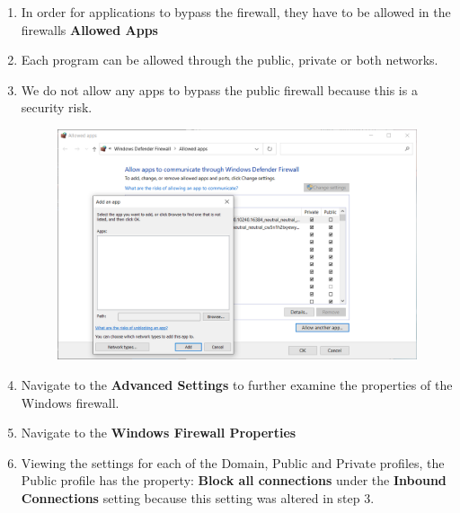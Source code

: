 \begin{enumerate}
\begin{figure}[H]
    \end{figure}
    \item In order for applications to bypass the firewall, they have to be allowed in the firewalls \textbf{Allowed Apps}
    \item Each program can be allowed through the public, private or both networks.
    \item We do not allow any apps to bypass the public firewall because this is a security risk.
    \begin{figure}[H]
        \includegraphics[width=\linewidth]{figures/pic8.png}
    \end{figure}
    \item Navigate to the \textbf{Advanced Settings} to further examine the properties of the Windows firewall.
    \item Navigate to the \textbf{Windows Firewall Properties}
    \item Viewing the settings for each of the Domain, Public and Private profiles, the Public profile has the property: \textbf{Block all connections} under the \textbf{Inbound Connections} setting because this setting was altered in step 3.
    \begin{figure}[H]
        \centering
        \begin{subfigure}[b]{0.3\textwidth}
            \centering

\end{subfigure}
\end{figure}
\end{enumerate}
